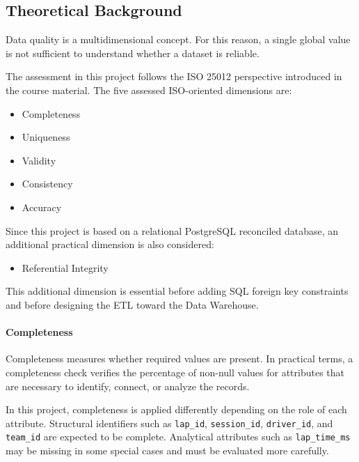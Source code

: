 \documentclass[a4paper,11pt]{article}
\begin{document}
	\subsection{Theoretical Background}
	
	Data quality is a multidimensional concept.
	For this reason, a single global value is not sufficient to understand whether a dataset is reliable.

	
	The assessment in this project follows the ISO 25012 perspective introduced in the course material.
	The five assessed ISO-oriented dimensions are:
	
	\begin{itemize}[leftmargin=1.2cm]
		\item Completeness
		\item Uniqueness
		\item Validity
		\item Consistency
		\item Accuracy
	\end{itemize}
	
	Since this project is based on a relational PostgreSQL reconciled database, an additional practical dimension is also considered:
	
	\begin{itemize}[leftmargin=1.2cm]
		\item Referential Integrity
	\end{itemize}
	
	This additional dimension is essential before adding SQL foreign key constraints and before designing the ETL toward the Data Warehouse.
	
	\paragraph{Completeness}
	
	Completeness measures whether required values are present.
	In practical terms, a completeness check verifies the percentage of non-null values for attributes that are necessary to identify, connect, or analyze the records.
	
	In this project, completeness is applied differently depending on the role of each attribute.
	Structural identifiers such as \texttt{lap\_id}, \texttt{session\_id}, \texttt{driver\_id}, and \texttt{team\_id} are expected to be complete.
	Analytical attributes such as \texttt{lap\_time\_ms} may be missing in some special cases and must be evaluated more carefully.
	
\end{document}
